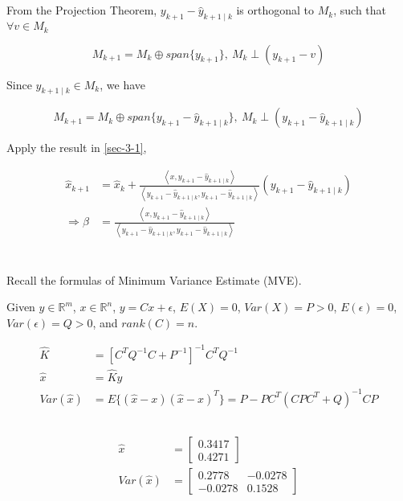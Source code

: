 \documentclass{article}
\theoremstyle{definition} %
\newcommand{\RR}{\mathbb{R}}
\begin{document}
\subsection{}
From the Projection Theorem, $y_{k+1}-\hat{y}_{k+1\mid k}$ is orthogonal to $M_k$, such that $\forall v \in M_k$

$$
M_{k+1} = M_k \oplus span\{y_{k+1}\}, \ M_k\perp (y_{k+1} - v)
$$

Since $\hat{y}_{k+1\mid k}\in M_k$, we have 

$$
M_{k+1} = M_k \oplus span\{y_{k+1}-\hat{y}_{k+1\mid k}\}, \ M_k\perp (y_{k+1} -\hat{y}_{k+1\mid k})
$$

Apply the result in \ref{sec-3-1}, 

\begin{align*}
    \hat{x}_{k+1} &= 
    \hat{x}_k + 
    \frac{\left\langle x, y_{k+1}-\hat{y}_{k+1 \mid k}\right\rangle}
    {\left\langle y_{k+1}-\hat{y}_{k+1 \mid k}, y_{k+1}-\hat{y}_{k+1 \mid k}\right\rangle}\left(y_{k+1}-\hat{y}_{k+1\mid k}\right) \\
    \Rightarrow \beta &= 
    \frac{\left\langle x, y_{k+1}-\hat{y}_{k+1\mid k}\right\rangle}
    {\left\langle y_{k+1}-\hat{y}_{k+1\mid k}, y_{k+1}-\hat{y}_{k+1\mid k}\right\rangle}
\end{align*}

\section{}
Recall the formulas of Minimum Variance Estimate (MVE).

Given $y\in \RR^m$, $x\in \RR^n$, $y = Cx+\epsilon$, $E(X) = 0$, $Var(X)=P>0$, $E(\epsilon)=0$, $Var(\epsilon) = Q > 0$, and $rank(C)=n$.

\begin{align*}
    \hat K &= [C^TQ^{-1}C + P^{-1}]^{-1}C^TQ^{-1}\\
    \hat x &= \hat K y\\
    Var(\hat x) &= E\{(\hat x-x)(\hat x - x)^T\} = P - PC^T(CPC^T + Q)^{-1}CP
\end{align*}


\subsection{}

\begin{align*}
    \hat x &= 
    \begin{bmatrix}
        0.3417\\
        0.4271
    \end{bmatrix}\\
    Var(\hat x) &=
    \begin{bmatrix}
        0.2778&-0.0278\\
        -0.0278&0.1528
    \end{bmatrix}
\end{align*}
\end{document}
